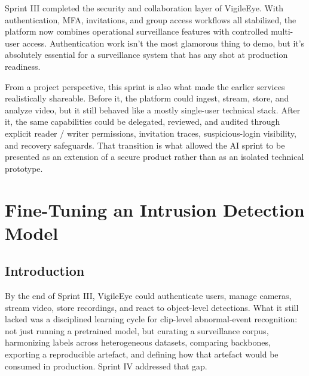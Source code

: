 \documentclass[12pt,a4paper,oneside]{report}
\begin{document}
\enlargethispage{6\baselineskip}
\hspace{0.8cm}Sprint III completed the security and collaboration layer of VigileEye. With authentication, MFA, invitations, and group access workflows all stabilized, the platform now combines operational surveillance features with controlled multi-user access. Authentication work isn't the most glamorous thing to demo, but it's absolutely essential for a surveillance system that has any shot at production readiness.

\hspace{0.8cm}From a project perspective, this sprint is also what made the earlier services realistically shareable. Before it, the platform could ingest, stream, store, and analyze video, but it still behaved like a mostly single-user technical stack. After it, the same capabilities could be delegated, reviewed, and audited through explicit reader / writer permissions, invitation traces, suspicious-login visibility, and recovery safeguards. That transition is what allowed the AI sprint to be presented as an extension of a secure product rather than as an isolated technical prototype.


\chapter{Fine-Tuning an Intrusion Detection Model}
\label{chap:sprint4}

\section{Introduction}
\label{sec:s4_intro}

\hspace{0.8cm}By the end of Sprint III, VigileEye could authenticate users, manage cameras, stream video, store recordings, and react to object-level detections. What it still lacked was a disciplined learning cycle for clip-level abnormal-event recognition: not just running a pretrained model, but curating a surveillance corpus, harmonizing labels across heterogeneous datasets, comparing backbones, exporting a reproducible artefact, and defining how that artefact would be consumed in production. Sprint IV addressed that gap.
\end{document}
